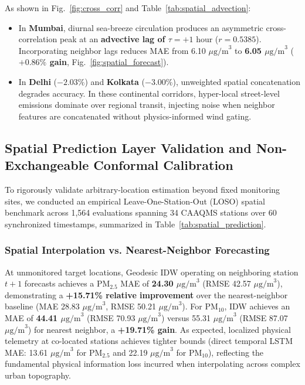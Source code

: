 \documentclass[conference]{IEEEtran}
\begin{document}
As shown in Fig.~\ref{fig:cross_corr} and Table~\ref{tab:spatial_advection}:
\begin{itemize}
    \item In \textbf{Mumbai}, diurnal sea-breeze circulation produces an asymmetric cross-correlation peak at an \textbf{advective lag of $\tau = +1\text{ hour}$} ($r = 0.5385$). Incorporating neighbor lags reduces MAE from 6.10 $\mu\text{g/m}^3$ to \textbf{6.05 $\mu\text{g/m}^3$} (\textbf{$+0.86\%$ gain}, Fig.~\ref{fig:spatial_forecast}).
    \item In \textbf{Delhi} ($-2.03\%$) and \textbf{Kolkata} ($-3.00\%$), unweighted spatial concatenation degrades accuracy. In these continental corridors, hyper-local street-level emissions dominate over regional transit, injecting noise when neighbor features are concatenated without physics-informed wind gating.
\end{itemize}



\subsection{Spatial Prediction Layer Validation and Non-Exchangeable Conformal Calibration}
To rigorously validate arbitrary-location estimation beyond fixed monitoring sites, we conducted an empirical Leave-One-Station-Out (LOSO) spatial benchmark across 1,564 evaluations spanning 34 CAAQMS stations over 60 synchronized timestamps, summarized in Table~\ref{tab:spatial_prediction}.

\subsubsection{Spatial Interpolation vs. Nearest-Neighbor Forecasting}
At unmonitored target locations, Geodesic IDW operating on neighboring station $t+1$ forecasts achieves a $\text{PM}_{2.5}$ MAE of \textbf{24.30 $\mu\text{g/m}^3$} (RMSE 42.57 $\mu\text{g/m}^3$), demonstrating a \textbf{+15.71\% relative improvement} over the nearest-neighbor baseline (MAE 28.83 $\mu\text{g/m}^3$, RMSE 50.21 $\mu\text{g/m}^3$). For $\text{PM}_{10}$, IDW achieves an MAE of \textbf{44.41 $\mu\text{g/m}^3$} (RMSE 70.93 $\mu\text{g/m}^3$) versus 55.31 $\mu\text{g/m}^3$ (RMSE 87.07 $\mu\text{g/m}^3$) for nearest neighbor, a \textbf{+19.71\% gain}. As expected, localized physical telemetry at co-located stations achieves tighter bounds (direct temporal LSTM MAE: 13.61 $\mu\text{g/m}^3$ for $\text{PM}_{2.5}$ and 22.19 $\mu\text{g/m}^3$ for $\text{PM}_{10}$), reflecting the fundamental physical information loss incurred when interpolating across complex urban topography.
\end{document}
